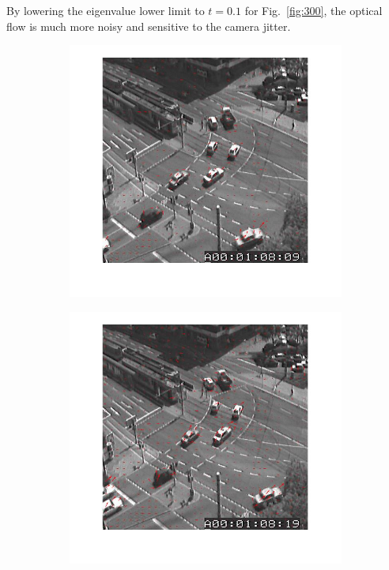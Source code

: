 \documentclass[a4paper]{iacas}
\begin{document}
By lowering the eigenvalue lower limit to $t=0.1$ for Fig.~\ref{fig:300}, the optical flow is much more noisy and sensitive to the camera jitter. 

\begin{figure}[!htbp]
	\centering
	\begin{subfigure}[b]{0.4\textwidth}
		\includegraphics[width=\textwidth]{302.jpg}
		\caption{}
		\label{fig:302}
	\end{subfigure}
	\begin{subfigure}[b]{0.4\textwidth}
		\includegraphics[width=\textwidth]{303.jpg}
		\caption{}
		\label{fig:303}
	\end{subfigure}
	

\end{figure}
\end{document}
